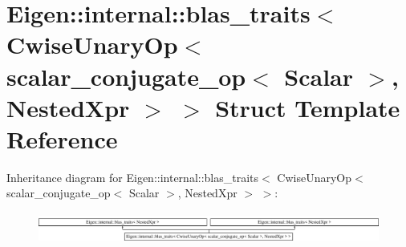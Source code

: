 \hypertarget{struct_eigen_1_1internal_1_1blas__traits_3_01_cwise_unary_op_3_01scalar__conjugate__op_3_01_scal305db6e51b207e2ce8fc6ea06996a706}{}\section{Eigen\+:\+:internal\+:\+:blas\+\_\+traits$<$ Cwise\+Unary\+Op$<$ scalar\+\_\+conjugate\+\_\+op$<$ Scalar $>$, Nested\+Xpr $>$ $>$ Struct Template Reference}
\label{struct_eigen_1_1internal_1_1blas__traits_3_01_cwise_unary_op_3_01scalar__conjugate__op_3_01_scal305db6e51b207e2ce8fc6ea06996a706}
Inheritance diagram for Eigen\+:\+:internal\+:\+:blas\+\_\+traits$<$ Cwise\+Unary\+Op$<$ scalar\+\_\+conjugate\+\_\+op$<$ Scalar $>$, Nested\+Xpr $>$ $>$\+:\begin{figure}[H]
\begin{center}
\leavevmode
\includegraphics[height=1.029412cm]{struct_eigen_1_1internal_1_1blas__traits_3_01_cwise_unary_op_3_01scalar__conjugate__op_3_01_scal305db6e51b207e2ce8fc6ea06996a706}
\end{center}
\end{figure}
